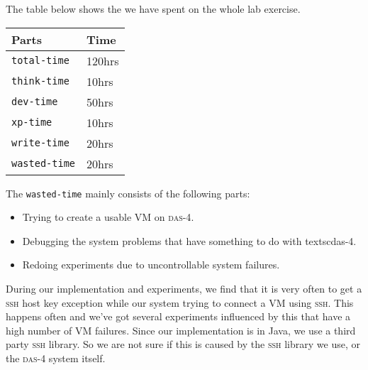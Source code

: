 The table below shows the we have spent on the whole lab
exercise.

  \begin{center}
  \begin{tabular}{|l|l|}
    \hline
    Parts       & Time \\
    \hline
    \texttt{total-time}  & 120hrs \\
    \texttt{think-time}  & 10hrs \\
    \texttt{dev-time}    & 50hrs \\
    \texttt{xp-time}     & 10hrs \\
    \texttt{write-time}  & 20hrs \\
    \texttt{wasted-time} & 20hrs \\
    \hline
  \end{tabular}
  \end{center}

The \texttt{wasted-time} mainly consists of the following parts:

\begin{itemize}
\item Trying to create a usable VM on \textsc{das-4}.
\item Debugging the system problems that have something to do with textsc{das-4}.
\item Redoing experiments due to uncontrollable system failures.
\end{itemize}


\appendix[Feedback]

During our implementation and experiments, we find that it is very
often to get a \textsc{ssh} host key exception while our system trying
to connect a VM using
\textsc{ssh}. This happens often and we've got several experiments influenced by this
that have a high number of VM failures. Since our implementation is in
Java, we use a third party \textsc{ssh} library. So we are not sure if
this is caused by the \textsc{ssh} library we use, or
the \textsc{das-4} system itself.
